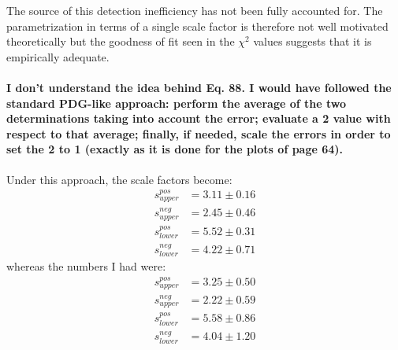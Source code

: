 \documentclass[12pt]{report}
\begin{document}
The source of this detection inefficiency has not been fully accounted for.
The parametrization in terms of a single scale factor is therefore not well motivated theoretically
but the goodness of fit seen in the $\chi^2$ values suggests that it is empirically adequate.

\paragraph{I don’t understand the idea behind Eq. 88. I would have followed the standard PDG-like approach:
    perform the average of the two determinations taking into account the error; evaluate a 2 value
    with respect to that average; finally, if needed, scale the errors in order to set the 2 to 1 (exactly
as it is done for the plots of page 64).\\}

Under this approach, the scale factors become:
\begin{align}
    s^{pos}_{upper} &= 3.11 \pm 0.16 \\
    s^{neg}_{upper} &= 2.45 \pm 0.46 \\
    s^{pos}_{lower} &= 5.52 \pm 0.31 \\
    s^{neg}_{lower} &= 4.22 \pm 0.71
\end{align}
whereas the numbers I had were:
\begin{align}
    s^{pos}_{upper} &= 3.25 \pm 0.50 \\
    s^{neg}_{upper} &= 2.22 \pm 0.59 \\
    s^{pos}_{lower} &= 5.58 \pm 0.86 \\
    s^{neg}_{lower} &= 4.04 \pm 1.20
\end{align}
\end{document}
